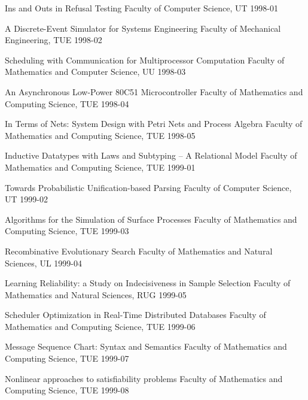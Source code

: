 \begin{multicols}{2}
         {Ins and Outs in Refusal Testing}
         {Faculty of Computer Science, UT}
         {1998-01}

         {A Discrete-Event Simulator for Systems Engineering}
         {Faculty of Mechanical Engineering, TUE}
         {1998-02}

         {Scheduling with Communication for Multiprocessor
Computation}
         {Faculty of Mathematics and Computer Science, UU}
         {1998-03}

         {An Asynchronous Low-Power 80C51 Microcontroller}
         {Faculty of Mathematics and Computing Science, TUE}
         {1998-04}

         {In Terms of Nets: System Design with Petri Nets and Process
Algebra}
         {Faculty of Mathematics and Computing Science, TUE}
         {1998-05}

         {Inductive Datatypes with Laws and Subtyping -- A Relational
Model}
         {Faculty of Mathematics and Computing Science, TUE}
         {1999-01}

         {Towards Probabilistic Unification-based Parsing}
         {Faculty of Computer Science, UT}
         {1999-02}

         {Algorithms for the Simulation of Surface Processes}
         {Faculty of Mathematics and Computing Science, TUE}
         {1999-03}

         {Recombinative Evolutionary Search}
         {Faculty of Mathematics and Natural Sciences, UL}
         {1999-04}

         {Learning Reliability: a Study on Indecisiveness in Sample
Selection}
         {Faculty of Mathematics and Natural Sciences, RUG}
         {1999-05}

         {Scheduler Optimization in Real-Time Distributed Databases}
         {Faculty of Mathematics and Computing Science, TUE}
         {1999-06}

         {Message Sequence Chart: Syntax and Semantics}
         {Faculty of Mathematics and Computing Science, TUE}
         {1999-07}

         {Nonlinear approaches to satisfiability problems}
         {Faculty of Mathematics and Computing Science, TUE}
         {1999-08}


\end{multicols}
